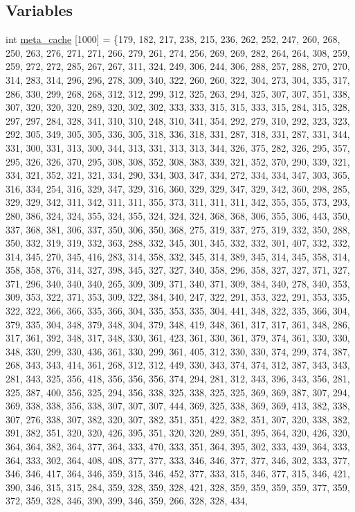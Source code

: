 \subsection*{Variables}
\begin{DoxyCompactItemize}
\item 
int \hyperlink{Collatz_8c_09_09_a3153326b42a60057c079e1910757729a}{meta\-\_\-cache} \mbox{[}1000\mbox{]} = \{179, 182, 217, 238, 215, 236, 262, 252, 247, 260, 268, 250, 263, 276, 271, 271, 266, 279, 261, 274, 256, 269, 269, 282, 264, 264, 308, 259, 259, 272, 272, 285, 267, 267, 311, 324, 249, 306, 244, 306, 288, 257, 288, 270, 270, 314, 283, 314, 296, 296, 278, 309, 340, 322, 260, 260, 322, 304, 273, 304, 335, 317, 286, 330, 299, 268, 268, 312, 312, 299, 312, 325, 263, 294, 325, 307, 307, 351, 338, 307, 320, 320, 320, 289, 320, 302, 302, 333, 333, 315, 315, 333, 315, 284, 315, 328, 297, 297, 284, 328, 341, 310, 310, 248, 310, 341, 354, 292, 279, 310, 292, 323, 323, 292, 305, 349, 305, 305, 336, 305, 318, 336, 318, 331, 287, 318, 331, 287, 331, 344, 331, 300, 331, 313, 300, 344, 313, 331, 313, 313, 344, 326, 375, 282, 326, 295, 357, 295, 326, 326, 370, 295, 308, 308, 352, 308, 383, 339, 321, 352, 370, 290, 339, 321, 334, 321, 352, 321, 321, 334, 290, 334, 303, 347, 334, 272, 334, 334, 347, 303, 365, 316, 334, 254, 316, 329, 347, 329, 316, 360, 329, 329, 347, 329, 342, 360, 298, 285, 329, 329, 342, 311, 342, 311, 311, 355, 373, 311, 311, 311, 342, 355, 355, 373, 293, 280, 386, 324, 324, 355, 324, 355, 324, 324, 324, 368, 368, 306, 355, 306, 443, 350, 337, 368, 381, 306, 337, 350, 306, 350, 368, 275, 319, 337, 275, 319, 332, 350, 288, 350, 332, 319, 319, 332, 363, 288, 332, 345, 301, 345, 332, 332, 301, 407, 332, 332, 314, 345, 270, 345, 416, 283, 314, 358, 332, 345, 314, 389, 345, 314, 345, 358, 314, 358, 358, 376, 314, 327, 398, 345, 327, 327, 340, 358, 296, 358, 327, 327, 371, 327, 371, 296, 340, 340, 340, 265, 309, 309, 371, 340, 371, 309, 384, 340, 278, 340, 353, 309, 353, 322, 371, 353, 309, 322, 384, 340, 247, 322, 291, 353, 322, 291, 353, 335, 322, 322, 366, 366, 335, 366, 304, 335, 353, 335, 304, 441, 348, 322, 335, 366, 304, 379, 335, 304, 348, 379, 348, 304, 379, 348, 419, 348, 361, 317, 317, 361, 348, 286, 317, 361, 392, 348, 317, 348, 330, 361, 423, 361, 330, 361, 379, 374, 361, 330, 330, 348, 330, 299, 330, 436, 361, 330, 299, 361, 405, 312, 330, 330, 374, 299, 374, 387, 268, 343, 343, 414, 361, 268, 312, 312, 449, 330, 343, 374, 374, 312, 387, 343, 343, 281, 343, 325, 356, 418, 356, 356, 356, 374, 294, 281, 312, 343, 396, 343, 356, 281, 325, 387, 400, 356, 325, 294, 356, 338, 325, 338, 325, 325, 369, 369, 387, 307, 294, 369, 338, 338, 356, 338, 307, 307, 307, 444, 369, 325, 338, 369, 369, 413, 382, 338, 307, 276, 338, 307, 382, 320, 307, 382, 351, 351, 422, 382, 351, 307, 320, 338, 382, 391, 382, 351, 320, 320, 426, 395, 351, 320, 320, 289, 351, 395, 364, 320, 426, 320, 364, 364, 382, 364, 377, 364, 333, 470, 333, 351, 364, 395, 302, 333, 439, 364, 333, 364, 333, 302, 364, 408, 408, 377, 377, 333, 346, 346, 377, 377, 346, 302, 333, 377, 346, 346, 417, 364, 346, 359, 315, 346, 452, 377, 333, 315, 346, 377, 315, 346, 421, 390, 346, 315, 315, 284, 359, 328, 359, 328, 421, 328, 359, 359, 359, 359, 377, 359, 372, 359, 328, 346, 390, 399, 346, 359, 266, 328, 328, 434, 
\end{DoxyCompactItemize}
